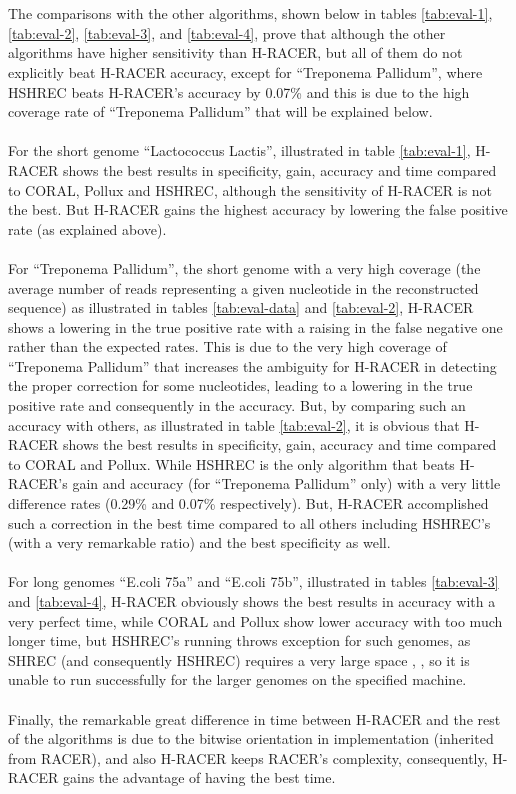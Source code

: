 \documentclass[12pt,openany]{llncs}
\begin{document}
\\\\
The comparisons with the other algorithms, shown below in tables \ref{tab:eval-1}, \ref{tab:eval-2}, \ref{tab:eval-3}, and \ref{tab:eval-4}, prove that although the other algorithms have higher sensitivity than H-RACER, but all of them do not explicitly beat H-RACER accuracy, except for \enquote{Treponema Pallidum}, where HSHREC beats H-RACER's accuracy by 0.07\% and this is due to the high coverage rate of \enquote{Treponema Pallidum} that will be explained below.  
\\\\
For the short genome \enquote{Lactococcus Lactis}, illustrated in table \ref{tab:eval-1}, H-RACER shows the best results in specificity, gain, accuracy and time compared to CORAL, Pollux and HSHREC, although the sensitivity of H-RACER is not the best. But H-RACER gains the highest accuracy by lowering the false positive rate (as explained above).
\\\\ 
For \enquote{Treponema Pallidum}, the short genome with a very high coverage (the average number of reads representing a given nucleotide in the reconstructed sequence) as illustrated in tables \ref{tab:eval-data} and \ref{tab:eval-2}, H-RACER shows a lowering in the true positive rate with a raising in the false negative one rather than the expected rates. This is due to the very high coverage of \enquote{Treponema Pallidum} that increases the ambiguity for H-RACER in detecting the proper correction for some nucleotides, leading to a lowering in the true positive rate and consequently in the accuracy. But, by comparing such an accuracy with others, as illustrated in table \ref{tab:eval-2}, it is obvious that H-RACER shows the best results in specificity, gain, accuracy and time compared to CORAL and Pollux. While HSHREC is the only algorithm that beats H-RACER's gain and accuracy (for \enquote{Treponema Pallidum} only) with a very little difference rates (0.29\% and 0.07\% respectively). But, H-RACER accomplished such a correction in the best time compared to all others including HSHREC's (with a very remarkable ratio) and the best specificity as well.
\\\\
For long genomes \enquote{E.coli 75a} and \enquote{E.coli 75b}, illustrated in tables \ref{tab:eval-3} and \ref{tab:eval-4}, H-RACER obviously shows the best results in accuracy with a very perfect time, while CORAL and Pollux show lower accuracy with too much longer time, but HSHREC's running throws exception for such genomes, as SHREC (and consequently HSHREC) requires a very large space \cite{Racer}, \cite{HShrec}, so it is unable to run successfully for the larger genomes on the specified machine.
\\\\ 
Finally, the remarkable great difference in time between H-RACER and the rest of the algorithms is due to the bitwise orientation in implementation (inherited from RACER), and also H-RACER keeps RACER's complexity, consequently, H-RACER gains the advantage of having the best time. 
\end{document}
